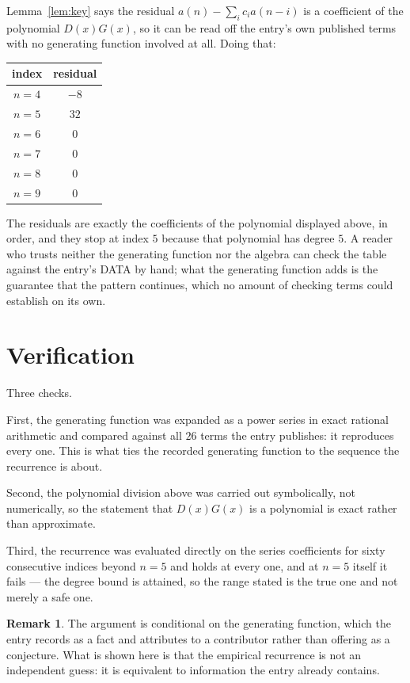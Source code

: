 \documentclass[11pt,a4paper]{article}
\theoremstyle{plain}
\theoremstyle{definition}
\newtheorem{remark}[theorem]{Remark}
\begin{document}
Lemma~\ref{lem:key} says the residual $a(n)-\sum_ic_ia(n-i)$ is a coefficient of the
polynomial $D(x)G(x)$, so it can be read off the entry's own published terms with no
generating function involved at all. Doing that:
\begin{center}
\begin{tabular}{cc}
index & residual \\ \hline
$n=4$ & $-8$ \\
$n=5$ & $32$ \\
$n=6$ & $0$ \\
$n=7$ & $0$ \\
$n=8$ & $0$ \\
$n=9$ & $0$
\end{tabular}
\end{center}
The residuals are exactly the coefficients of the polynomial displayed above, in order, and
they stop at index $5$ because that polynomial has degree $5$. A reader who trusts
neither the generating function nor the algebra can check the table against the entry's DATA
by hand; what the generating function adds is the guarantee that the pattern continues, which
no amount of checking terms could establish on its own.

\section{Verification}

Three checks.

First, the generating function was expanded as a power series in exact rational arithmetic and
compared against all $26$ terms the entry publishes: it reproduces every one. This is
what ties the recorded generating function to the sequence the recurrence is about.

Second, the polynomial division above was carried out symbolically, not numerically, so the
statement that $D(x)G(x)$ is a polynomial is exact rather than approximate.

Third, the recurrence was evaluated directly on the series coefficients for sixty consecutive
indices beyond $n=5$ and holds at every one, and at $n=5$ itself it fails --- the
degree bound is attained, so the range stated is the true one and not merely a safe one.

\begin{remark}
The argument is conditional on the generating function, which the entry records as a fact and
attributes to a contributor rather than offering as a conjecture. What is shown here is that
the empirical recurrence is not an independent guess: it is equivalent to information the
entry already contains.
\end{remark}
\end{document}
